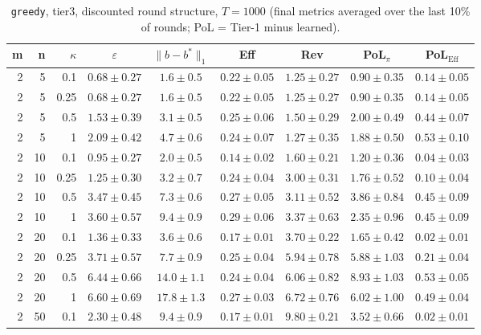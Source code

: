 \begin{table}[htbp]
\centering
\scriptsize
\caption{\texttt{greedy}, tier3, discounted round structure, $T=1000$ (final metrics averaged over the last 10\% of rounds; PoL = Tier-1 minus learned).}
\label{tab:tier3_greedy_discounted}
\begin{tabular}{@{}rrrcccccc@{}}
\toprule
m & n & $\kappa$ & $\varepsilon$ & $\|b-b^*\|_1$ & Eff & Rev & PoL$_\pi$ & PoL$_\mathrm{Eff}$ \\
\midrule
2 & 5 & 0.1 & $0.68 \pm 0.27$ & $1.6 \pm 0.5$ & $0.22 \pm 0.05$ & $1.25 \pm 0.27$ & $0.90 \pm 0.35$ & $0.14 \pm 0.05$ \\
2 & 5 & 0.25 & $0.68 \pm 0.27$ & $1.6 \pm 0.5$ & $0.22 \pm 0.05$ & $1.25 \pm 0.27$ & $0.90 \pm 0.35$ & $0.14 \pm 0.05$ \\
2 & 5 & 0.5 & $1.53 \pm 0.39$ & $3.1 \pm 0.5$ & $0.25 \pm 0.06$ & $1.50 \pm 0.29$ & $2.00 \pm 0.49$ & $0.44 \pm 0.07$ \\
2 & 5 & 1 & $2.09 \pm 0.42$ & $4.7 \pm 0.6$ & $0.24 \pm 0.07$ & $1.27 \pm 0.35$ & $1.88 \pm 0.50$ & $0.53 \pm 0.10$ \\
2 & 10 & 0.1 & $0.95 \pm 0.27$ & $2.0 \pm 0.5$ & $0.14 \pm 0.02$ & $1.60 \pm 0.21$ & $1.20 \pm 0.36$ & $0.04 \pm 0.03$ \\
2 & 10 & 0.25 & $1.25 \pm 0.30$ & $3.2 \pm 0.7$ & $0.24 \pm 0.04$ & $3.00 \pm 0.31$ & $1.76 \pm 0.52$ & $0.10 \pm 0.04$ \\
2 & 10 & 0.5 & $3.47 \pm 0.45$ & $7.3 \pm 0.6$ & $0.27 \pm 0.05$ & $3.11 \pm 0.52$ & $3.86 \pm 0.84$ & $0.45 \pm 0.09$ \\
2 & 10 & 1 & $3.60 \pm 0.57$ & $9.4 \pm 0.9$ & $0.29 \pm 0.06$ & $3.37 \pm 0.63$ & $2.35 \pm 0.96$ & $0.45 \pm 0.09$ \\
2 & 20 & 0.1 & $1.36 \pm 0.33$ & $3.6 \pm 0.6$ & $0.17 \pm 0.01$ & $3.70 \pm 0.22$ & $1.65 \pm 0.42$ & $0.02 \pm 0.01$ \\
2 & 20 & 0.25 & $3.71 \pm 0.57$ & $7.7 \pm 0.9$ & $0.25 \pm 0.04$ & $5.94 \pm 0.78$ & $5.88 \pm 1.03$ & $0.21 \pm 0.04$ \\
2 & 20 & 0.5 & $6.44 \pm 0.66$ & $14.0 \pm 1.1$ & $0.24 \pm 0.04$ & $6.06 \pm 0.82$ & $8.93 \pm 1.03$ & $0.53 \pm 0.05$ \\
2 & 20 & 1 & $6.60 \pm 0.69$ & $17.8 \pm 1.3$ & $0.27 \pm 0.03$ & $6.72 \pm 0.76$ & $6.02 \pm 1.00$ & $0.49 \pm 0.04$ \\
2 & 50 & 0.1 & $2.30 \pm 0.48$ & $9.4 \pm 0.9$ & $0.17 \pm 0.01$ & $9.80 \pm 0.21$ & $3.52 \pm 0.66$ & $0.02 \pm 0.01$ \\

\end{tabular}
\end{table}
